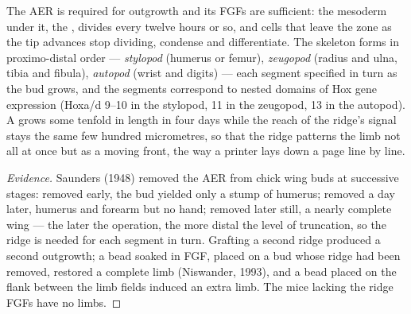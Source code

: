 \begin{proposition}\label{prop:b2:limb-organogenesis:aer}
The AER is required for outgrowth and its FGFs are sufficient: the
mesoderm under it, the \emph{}, divides every twelve
hours or so, and cells that leave the zone as the tip advances stop
dividing, condense and differentiate. The skeleton forms in
proximo-distal order --- \emph{stylopod} (humerus or femur),
\emph{zeugopod} (radius and ulna, tibia and fibula), \emph{autopod}
(wrist and digits) --- each segment specified in turn as the bud
grows, and the segments correspond to nested domains of Hox gene
expression (Hoxa/d 9--10 in the stylopod, 11 in the zeugopod, 13 in
the autopod). A  grows some tenfold in length in four days
while the reach of the ridge's signal stays the same few hundred
micrometres, so that the ridge patterns the limb not all at once but
as a moving front, the way a printer lays down a page line by line.
\end{proposition}
\begin{proof}[Evidence]
Saunders (1948) removed the AER from chick wing buds at successive
stages: removed early, the bud yielded only a stump of humerus;
removed a day later, humerus and forearm but no hand; removed later
still, a nearly complete wing --- the later the operation, the more
distal the level of truncation, so the ridge is needed for each
segment in turn. Grafting a second ridge produced a second
outgrowth; a bead soaked in FGF, placed on a bud whose ridge had
been removed, restored a complete limb (Niswander, 1993), and a bead
placed on the flank between the limb fields induced an extra limb.
The mice lacking the ridge FGFs have no limbs.
\end{proof}

